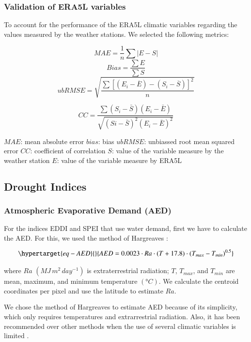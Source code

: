 \documentclass[
  number,
  preprint,
  3p,
  onecolumn]{elsarticle}
\begin{document}
\hypertarget{validation-of-era5l-variables}{%
\subsubsection{Validation of ERA5L
variables}\label{validation-of-era5l-variables}}

To account for the performance of the ERA5L climatic variables regarding
the values measured by the weather stations. We selected the following
metrics:

\[MAE = \frac{1}{n}\sum |{E-S}|\] \[Bias = \frac{\sum E}{\sum S}\]
\[ubRMSE =\sqrt{\frac{\sum{ \left[ (E_i-\overline{E})-(S_i-\overline{S}) \right ] ^2}}{n}}\]

\[CC = \frac{\sum (S_i-\bar{S})(E_i-\bar{E})}{\sqrt{(Si-\bar{S})^2(E_i-\bar{E})^2}}\]

\(MAE\): mean absolute error \(bias\): bias \(ubRMSE\): unbiassed root
mean squared error \(CC\): coefficient of correlation \(S\): value of
the variable measure by the weather station \(E\): value of the variable
measure by ERA5L

\hypertarget{drought-indices}{%
\subsection{Drought Indices}\label{drought-indices}}

\hypertarget{atmospheric-evaporative-demand-aed}{%
\subsubsection{Atmospheric Evaporative Demand
(AED)}\label{atmospheric-evaporative-demand-aed}}

For the indices EDDI and SPEI that use water demand, first we have to
calculate the AED. For this, we used the method of Hargreaves
\citep{Hargreaves1994, Hargreaves1985}:

\begin{equation}\protect\hypertarget{eq-AED}{}{AED = 0.0023\cdot Ra\cdot (T+17.8)\cdot (T_{max}-T_{min})^{0.5}}\label{eq-AED}\end{equation}

where \(Ra\) \((MJ\,m^2\, day^{-1})\) is extraterrestrial radiation;
\(T\), \(T_{max}\), and \(T_{min}\) are mean, maximum, and minimum
temperature \((°C)\). We calculate the centroid coordinates per pixel
and use the latitude to estimate \(Ra\).

We chose the method of Hargreaves to estimate AED because of its
simplicity, which only requires temperatures and extrarrestrial
radiation. Also, it has been recommended over other methods when the use
of several climatic variables is limited \citep{Vicente-Serrano2014}.
\end{document}
